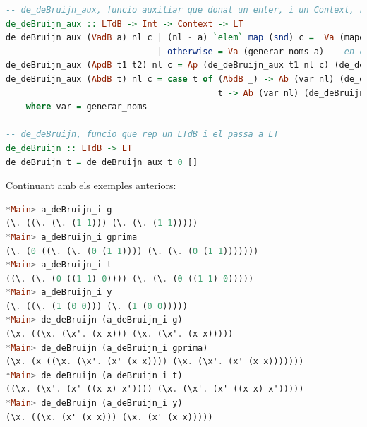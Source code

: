 \documentclass[10pt,a4paper]{article}
\begin{document}
\begin{lstlisting}[language=Haskell]
-- de_deBruijn_aux, funcio auxiliar que donat un enter, i un Context, retorna el LTdB convertit a LT
de_deBruijn_aux :: LTdB -> Int -> Context -> LT
de_deBruijn_aux (VadB a) nl c | (nl - a) `elem` map (snd) c =  Va (mapeja_inv (nl - a) c)
                              | otherwise = Va (generar_noms a) -- en cas de variables lliures podem generar el nom directament
de_deBruijn_aux (ApdB t1 t2) nl c = Ap (de_deBruijn_aux t1 nl c) (de_deBruijn_aux t2 nl c)
de_deBruijn_aux (AbdB t) nl c = case t of (AbdB _) -> Ab (var nl) (de_deBruijn_aux t (nl+1) (((var nl),nl):c))
                                          t -> Ab (var nl) (de_deBruijn_aux t nl (((var nl),nl):c))
    where var = generar_noms

-- de_deBruijn, funcio que rep un LTdB i el passa a LT
de_deBruijn :: LTdB -> LT
de_deBruijn t = de_deBruijn_aux t 0 []
\end{lstlisting}

Continuant amb els exemples anteriors:

\begin{lstlisting}[language=Haskell]
*Main> a_deBruijn_i g
(\. ((\. (\. (1 1))) (\. (\. (1 1)))))
*Main> a_deBruijn_i gprima
(\. (0 ((\. (\. (0 (1 1)))) (\. (\. (0 (1 1)))))))
*Main> a_deBruijn_i t
((\. (\. (0 ((1 1) 0)))) (\. (\. (0 ((1 1) 0)))))
*Main> a_deBruijn_i y
(\. ((\. (1 (0 0))) (\. (1 (0 0)))))
*Main> de_deBruijn (a_deBruijn_i g)
(\x. ((\x. (\x'. (x x))) (\x. (\x'. (x x)))))
*Main> de_deBruijn (a_deBruijn_i gprima)
(\x. (x ((\x. (\x'. (x' (x x)))) (\x. (\x'. (x' (x x)))))))
*Main> de_deBruijn (a_deBruijn_i t)
((\x. (\x'. (x' ((x x) x')))) (\x. (\x'. (x' ((x x) x')))))
*Main> de_deBruijn (a_deBruijn_i y)
(\x. ((\x. (x' (x x))) (\x. (x' (x x)))))
\end{lstlisting}
\end{document}

